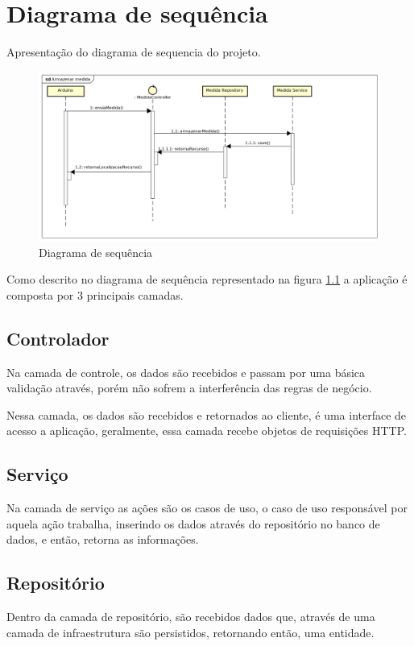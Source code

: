 \chapter{Diagrama de sequência}

Apresentação do diagrama de sequencia do projeto.

\begin{figure}[H]
    \label{figure_diagrama_sequencia}
    \centering
    \caption{Diagrama de sequência}
    \includegraphics[scale=0.40]{diagrams/sequencia.png}
    \hfill
\end{figure}

Como descrito no diagrama de sequência representado na figura \ref{figure_diagrama_sequencia} a aplicação é composta por 3 principais camadas.

\section{Controlador}

Na camada de controle, os dados são recebidos e passam por uma básica validação através, porém não sofrem a interferência das regras de negócio.

Nessa camada, os dados são recebidos e retornados ao cliente, é uma interface de acesso a aplicação, geralmente, essa camada recebe objetos de requisições HTTP.

\section{Serviço}

Na camada de serviço as ações são os casos de uso, o caso de uso responsável por aquela ação trabalha, inserindo os dados através do repositório no banco de dados, e então, retorna as informações.

\section{Repositório}

Dentro da camada de repositório, são recebidos dados que, através de uma camada de infraestrutura são persistidos, retornando então, uma entidade.
